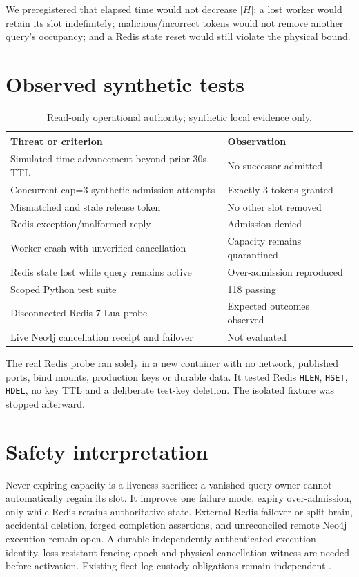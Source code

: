 \documentclass[11pt]{article}
\begin{document}
We preregistered that elapsed time would not decrease $|H|$; a lost worker would retain its slot indefinitely; malicious/incorrect tokens would not remove another query's occupancy; and a Redis state reset would still violate the physical bound.
\section{Observed synthetic tests}
\begin{table}[h]\centering
\caption{Read-only operational authority; synthetic local evidence only.}
\begin{tabular}{ll}\toprule
Threat or criterion & Observation\\\midrule
Simulated time advancement beyond prior 30s TTL & No successor admitted\\
Concurrent cap=3 synthetic admission attempts & Exactly 3 tokens granted\\
Mismatched and stale release token & No other slot removed\\
Redis exception/malformed reply & Admission denied\\
Worker crash with unverified cancellation & Capacity remains quarantined\\
Redis state lost while query remains active & Over-admission reproduced\\
Scoped Python test suite & 118 passing\\
Disconnected Redis 7 Lua probe & Expected outcomes observed\\
Live Neo4j cancellation receipt and failover & Not evaluated\\\bottomrule
\end{tabular}
\end{table}
The real Redis probe ran solely in a new container with no network, published ports, bind mounts, production keys or durable data. It tested Redis \texttt{HLEN}, \texttt{HSET}, \texttt{HDEL}, no key TTL and a deliberate test-key deletion. The isolated fixture was stopped afterward.
\section{Safety interpretation}
Never-expiring capacity is a liveness sacrifice: a vanished query owner cannot automatically regain its slot. It improves one failure mode, expiry over-admission, only while Redis retains authoritative state. External Redis failover or split brain, accidental deletion, forged completion assertions, and unreconciled remote Neo4j execution remain open. A durable independently authenticated execution identity, loss-resistant fencing epoch and physical cancellation witness are needed before activation. Existing fleet log-custody obligations remain independent \cite{nist}.
\end{document}
